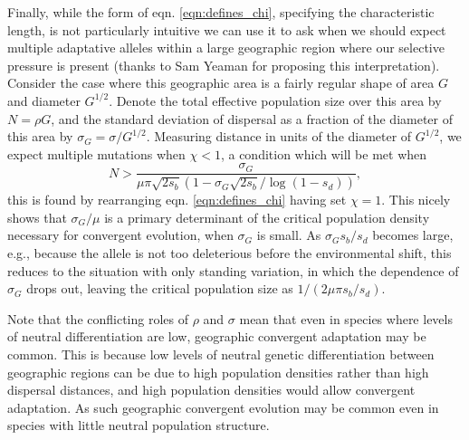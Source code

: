 \documentclass{article}
\begin{document}
Finally, while the form of eqn. \eqref{eqn:defines_chi}, specifying
the characteristic length, is not
particularly intuitive we can use it to ask when we should expect
multiple adaptative alleles within a large geographic region  where our selective pressure
is present (thanks to Sam Yeaman for proposing this
interpretation). Consider the case where this geographic area is a fairly regular
shape of area $G$ and diameter $G^{1/2}$. Denote the total effective population size
over this area by $N = \rho G$, and the standard deviation of dispersal as a
fraction of the diameter of this area by $\sigma_G  = \sigma/
G^{1/2}$. Measuring distance in units of the diameter of $G^{1/2}$,
we expect multiple mutations when $\chi<1$, 
a condition which will be met when 
\begin{equation}
N > \frac{\sigma_G}{ \mu \pi \sqrt{2s_b} \left(1 -  \sigma_G \sqrt{2s_b} /\log (1-s_d) \right)},
\end{equation}
this is found by rearranging eqn. \eqref{eqn:defines_chi} having set
$\chi=1$. This nicely shows that $\sigma_G/\mu$ is a primary
determinant of the critical population density necessary for
convergent evolution, when $\sigma_G$ is small. 
As $\sigma_G s_b/s_d$ becomes large, 
e.g., because the allele is not too deleterious before the environmental shift, 
this reduces to the situation with only standing variation,
in which the dependence of  $\sigma_G$
drops out, leaving the critical population size as $1/(2 \mu \pi s_b/s_d)$.

Note that the conflicting roles of $\rho$ and $\sigma$ mean that even in
species where levels of neutral differentiation are low, geographic
convergent adaptation may be common. This is because low levels of
neutral genetic differentiation between geographic regions can be due to high population
densities rather than high dispersal distances, and high population
densities would allow convergent adaptation. As such geographic convergent
evolution may be common even in species with little neutral population structure.





\end{document}
